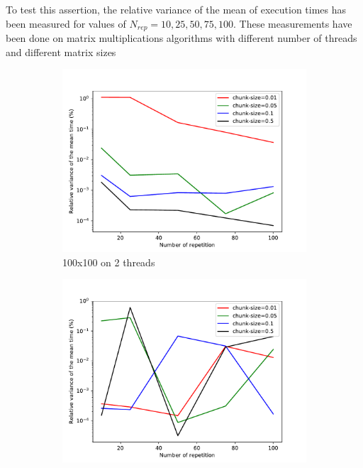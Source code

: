 To test this assertion, the relative variance of the mean of execution times has been measured for values of $N_{rep}=10,25,50,75,100$. These measurements have been done on matrix multiplications algorithms with different number of threads and different matrix sizes
\begin{figure}
	\centering
	\begin{subfigure}[b]{0.475\textwidth}
		\centering
		\includegraphics[width=\textwidth]{images/relvar_100_2.pdf}
		\caption[Network2]%
		{{\small 100x100 on 2 threads}}    
	\end{subfigure}
	\hfill
	\begin{subfigure}[b]{0.475\textwidth}  
		\centering 
		\includegraphics[width=\textwidth]{images/relvar_500_2.pdf}

\end{subfigure}
\end{figure}
